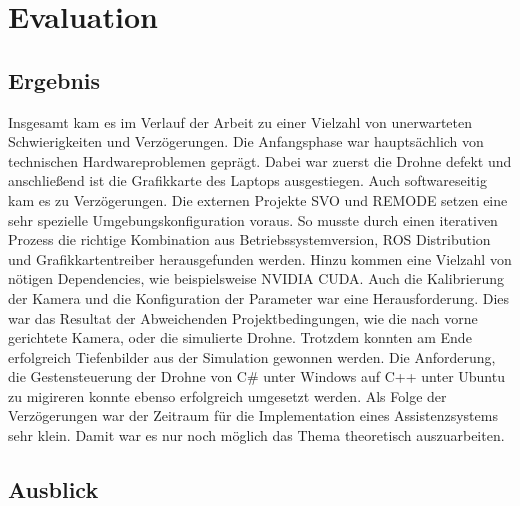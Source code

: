 \chapter{Evaluation}
\section{Ergebnis}
Insgesamt kam es im Verlauf der Arbeit zu einer Vielzahl von unerwarteten Schwierigkeiten und Verzögerungen. Die Anfangsphase war hauptsächlich von technischen Hardwareproblemen geprägt. Dabei war zuerst die Drohne defekt und anschließend ist die Grafikkarte des Laptops ausgestiegen. \newline
Auch softwareseitig kam es zu Verzögerungen. Die externen Projekte SVO und REMODE setzen eine sehr spezielle Umgebungskonfiguration voraus. So musste durch einen iterativen Prozess die richtige Kombination aus Betriebssystemversion, ROS Distribution und Grafikkartentreiber herausgefunden werden. Hinzu kommen eine Vielzahl von nötigen Dependencies, wie beispielsweise NVIDIA CUDA.  \newline
Auch die Kalibrierung der Kamera und die Konfiguration der Parameter war eine Herausforderung. Dies war das Resultat der Abweichenden Projektbedingungen, wie die nach vorne gerichtete Kamera, oder die simulierte Drohne. \newline
Trotzdem konnten am Ende erfolgreich Tiefenbilder aus der Simulation gewonnen werden. Die Anforderung, die Gestensteuerung der Drohne von C\# unter Windows auf C++ unter Ubuntu zu migireren konnte ebenso erfolgreich umgesetzt werden. \newline
Als Folge der Verzögerungen war der Zeitraum für die Implementation eines Assistenzsystems sehr klein. Damit war es nur noch möglich das Thema theoretisch auszuarbeiten.

\section{Ausblick}
